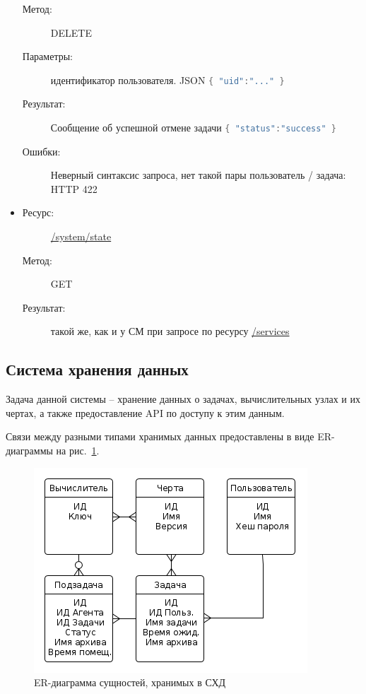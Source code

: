 \documentclass[a4paper,12pt]{report}
\numberwithin{equation}{section}
\begin{document}
\begin{itemize}
\begin{description}
      \item[Метод:] DELETE
      \item[Параметры:] идентификатор пользователя. JSON 
      \lstinline[language=Java]|{ "uid":"..." }|
      \item[Результат:] Сообщение об успешной отмене задачи
      \lstinline[language=Java]|{ "status":"success" }|
      \item[Ошибки:] Неверный синтаксис запроса, нет такой пары пользователь / задача: HTTP 422
    \end{description}
    \item
    \begin{description}
      \item[Ресурс:] \url{/system/state}
      \item[Метод:] GET
      \item[Результат:] такой же, как и у СМ при запросе по ресурсу \url{/services}
    \end{description}
  \end{itemize}
  
  \subsection{Система хранения данных}
  Задача данной системы -- хранение данных о задачах, вычислительных узлах и их чертах, а также предоставление API по доступу к этим данным.
  
  Связи между разными типами хранимых данных предоставлены в виде ER-диаграммы на рис.~\ref{fig:db-er}.
  
  \begin{figure}[h!]
    \centering
    \includegraphics[width=.9\linewidth]{diagrams/db/er}
    \caption{ER-диаграмма сущностей, хранимых в СХД}
    \label{fig:db-er}
  \end{figure}
  
\end{document}
